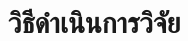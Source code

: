 \section{วิธีดำเนินการวิจัย}


\begin{subitems}
    \item \dotfill
    \item \dotfill
\end{subitems}

